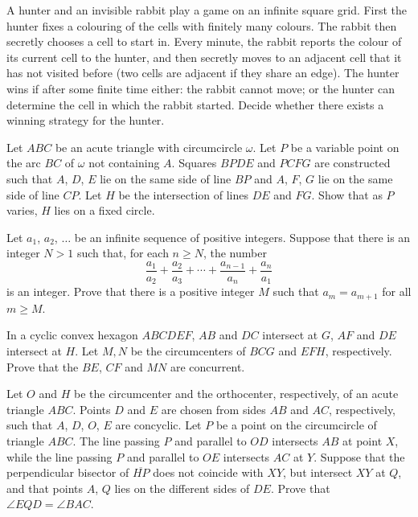 \documentclass[11pt]{scrartcl}
\begin{document}
\begin{problem}[3470579368412517052]
	A hunter and an invisible rabbit play a game on an infinite square grid. First the hunter fixes a colouring of the cells with finitely many colours. The rabbit then secretly chooses a cell to start in. Every minute, the rabbit reports the colour of its current cell to the hunter, and then secretly moves to an adjacent cell that it has not visited before (two cells are adjacent if they share an edge). The hunter wins if after some finite time either:
the rabbit cannot move; or
the hunter can determine the cell in which the rabbit started.
Decide whether there exists a winning strategy for the hunter.
\end{problem}
\begin{problem}[8700998965901287095]
Let \(ABC\) be an acute triangle with circumcircle \(\omega\). Let \(P\) be a variable point on the arc \(BC\) of \(\omega\) not containing \(A\). Squares \(BPDE\) and \(PCFG\) are constructed such that \(A\), \(D\), \(E\) lie on the same side of line \(BP\) and \(A\), \(F\), \(G\) lie on the same side of line \(CP\). Let \(H\) be the intersection of lines \(DE\) and \(FG\). Show that as \(P\) varies, \(H\) lies on a fixed circle.
\end{problem}
\begin{problem}[402654566950359]
Let $a_1$, $a_2$, $\ldots$ be an infinite sequence of positive integers. Suppose that there is an integer $N > 1$ such that, for each $n \geq N$, the number
$$\frac{a_1}{a_2} + \frac{a_2}{a_3} + \cdots + \frac{a_{n-1}}{a_n} + \frac{a_n}{a_1}$$is an integer. Prove that there is a positive integer $M$ such that $a_m = a_{m+1}$ for all $m \geq M$.
\end{problem}
\begin{problem}[409530198849693]
In a cyclic convex hexagon $ABCDEF$, $AB$ and $DC$ intersect at $G$, $AF$ and $DE$ intersect at $H$. Let $M, N$ be the circumcenters of $BCG$ and $EFH$, respectively. Prove that the $BE$, $CF$ and $MN$ are concurrent.
\end{problem}
\begin{problem}[457324036151847]
Let $O$ and $H$ be the circumcenter and the orthocenter, respectively, of an acute triangle $ABC$. Points $D$ and $E$ are chosen from sides $AB$ and $AC$, respectively, such that $A$, $D$, $O$, $E$ are concyclic. Let $P$ be a point on the circumcircle of triangle $ABC$. The line passing $P$ and parallel to $OD$ intersects $AB$ at point $X$, while the line passing $P$ and parallel to $OE$ intersects $AC$ at $Y$. Suppose that the perpendicular bisector of $\overline{HP}$ does not coincide with $XY$, but intersect $XY$ at $Q$, and that points $A$, $Q$ lies on the different sides of $DE$. Prove that $\angle EQD = \angle BAC$.
\end{problem}
\end{document}
